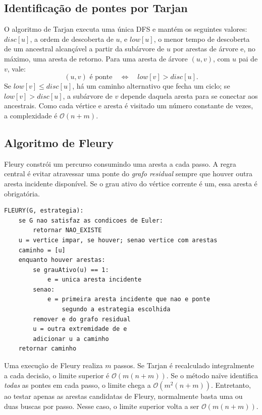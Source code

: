 \documentclass[12pt,a4paper]{article}
\newcommand{\ordem}[1]{\mathcal{O}\!\left(#1\right)}
\newcommand{\naive}{na\"ive}
\begin{document}
\subsection{Identificação de pontes por Tarjan}
O algoritmo de Tarjan executa uma única DFS e mantém os seguintes valores:
$disc[u]$, a ordem de descoberta de $u$, e $low[u]$, o menor tempo de
descoberta de um ancestral alcançável a partir da subárvore de $u$
por arestas de árvore e, no máximo, uma aresta de retorno.
Para uma aresta de árvore $(u,v)$, com $u$ pai de $v$, vale:
\begin{equation}\label{eq:tarjan}
\boxed{(u,v)\text{ é ponte}\quad\Longleftrightarrow\quad low[v]>disc[u].}
\end{equation}
Se $low[v]\le disc[u]$, há um caminho alternativo que fecha um ciclo;
se $low[v]>disc[u]$, a subárvore de $v$ depende daquela aresta
para se conectar aos ancestrais. Como cada vértice e aresta é visitado
um número constante de vezes, a complexidade é $\ordem{n+m}$.

\subsection{Algoritmo de Fleury}
Fleury constrói um percurso consumindo uma aresta a cada passo. A regra
central é evitar atravessar uma ponte do \emph{grafo residual} sempre que
houver outra aresta incidente disponível. Se o grau ativo do vértice
corrente é um, essa aresta é obrigatória.

\begin{lstlisting}[caption={Pseudocódigo do algoritmo de Fleury.}]
FLEURY(G, estrategia):
    se G nao satisfaz as condicoes de Euler:
        retornar NAO_EXISTE
    u = vertice impar, se houver; senao vertice com arestas
    caminho = [u]
    enquanto houver arestas:
        se grauAtivo(u) == 1:
            e = unica aresta incidente
        senao:
            e = primeira aresta incidente que nao e ponte
                segundo a estrategia escolhida
        remover e do grafo residual
        u = outra extremidade de e
        adicionar u a caminho
    retornar caminho
\end{lstlisting}

Uma execução de Fleury realiza $m$ passos. Se Tarjan é recalculado
integralmente a cada decisão, o limite superior é $\ordem{m(n+m)}$.
Se o método \naive{} identifica \emph{todas} as pontes em cada passo,
o limite chega a $\ordem{m^2(n+m)}$. Entretanto, ao testar apenas
as arestas candidatas de Fleury, normalmente basta uma ou duas buscas
por passo. Nesse caso, o limite superior volta a ser $\ordem{m(n+m)}$.
\end{document}
